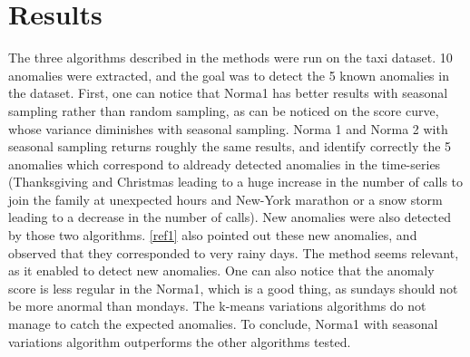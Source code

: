 \documentclass[11pt]{article}
\begin{document}

\section{Results}
The three algorithms described in the methods were run on the taxi dataset. 
10 anomalies were extracted, and the goal was to detect the 5 known anomalies in the dataset. 
First, one can notice that Norma1 has better results with seasonal sampling rather than random sampling, as can be noticed on the score curve, whose variance diminishes with seasonal sampling. 
Norma 1 and Norma 2 with seasonal sampling returns roughly the same results, and identify correctly the 5 anomalies which correspond to aldready detected anomalies in the time-series (Thanksgiving and Christmas leading to a huge increase in the number of calls to join the family at unexpected hours and New-York marathon or a snow storm leading to a decrease in the number of calls). 
New anomalies were also detected by those two algorithms.
\ref{ref1} also pointed out these new anomalies, and observed that they corresponded to very rainy days. 
The method seems relevant, as it enabled to detect new anomalies. 
One can also notice that the anomaly score is less regular in the Norma1, which is a good thing, as sundays should not be more anormal than mondays. 
The k-means variations algorithms do not manage to catch the expected anomalies. 
To conclude, Norma1 with seasonal variations algorithm outperforms the other algorithms tested. 
\end{document}
